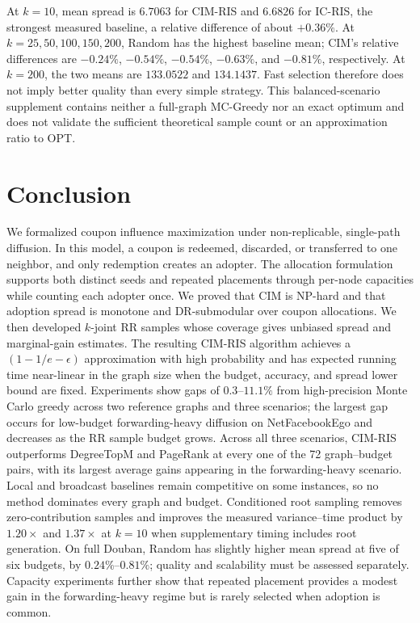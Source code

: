 \documentclass[sigconf,balance=false]{acmart}
\newcommand{\CIMRIS}{\textsc{CIM-RIS}}
\begin{document}
At $k=10$, mean spread is $6.7063$ for \CIMRIS{} and $6.6826$ for IC-RIS,
the strongest measured baseline, a relative difference of about $+0.36\%$.
At $k=25,50,100,150,200$, Random has the highest baseline mean; CIM's
relative differences are $-0.24\%$, $-0.54\%$, $-0.54\%$, $-0.63\%$,
and $-0.81\%$, respectively. At $k=200$, the two means are $133.0522$
and $134.1437$. Fast selection therefore does not imply better quality
than every simple strategy. This balanced-scenario supplement contains
neither a full-graph MC-Greedy nor an exact optimum and does not validate
the sufficient theoretical sample count or an approximation ratio to OPT.

\section{Conclusion}
\label{sec:conclusion}

We formalized coupon influence maximization under non-replicable,
single-path diffusion.
In this model, a coupon is redeemed, discarded, or transferred to one
neighbor, and only redemption creates an adopter.
The allocation formulation supports both distinct seeds and repeated
placements through per-node capacities while counting each adopter once.
We proved that CIM is NP-hard and that adoption spread is monotone and
DR-submodular over coupon allocations.
We then developed $k$-joint RR samples whose coverage gives unbiased
spread and marginal-gain estimates.
The resulting \CIMRIS{} algorithm achieves a
$(1-1/e-\epsilon)$ approximation with high probability and has expected
running time near-linear in the graph size when the budget, accuracy, and
spread lower bound are fixed.
Experiments show gaps of $0.3$--$11.1\%$ from high-precision Monte Carlo
greedy across two reference graphs and three scenarios; the largest gap
occurs for low-budget forwarding-heavy diffusion on NetFacebookEgo and
decreases as the RR sample budget grows.
Across all three scenarios, \CIMRIS{} outperforms DegreeTopM and PageRank at
every one of the 72 graph--budget pairs, with its largest average gains
appearing in the forwarding-heavy scenario.
Local and broadcast baselines remain competitive on some instances, so
no method dominates every graph and budget.
Conditioned root sampling removes zero-contribution samples and improves
the measured variance--time product by $1.20\times$ and $1.37\times$ at
$k=10$ when supplementary timing includes root generation.
On full Douban, Random has slightly higher mean spread at five of six
budgets, by $0.24\%$--$0.81\%$; quality and scalability must be assessed
separately. Capacity experiments further show that repeated
placement provides a modest gain in the forwarding-heavy regime but is
rarely selected when adoption is common.
\end{document}
